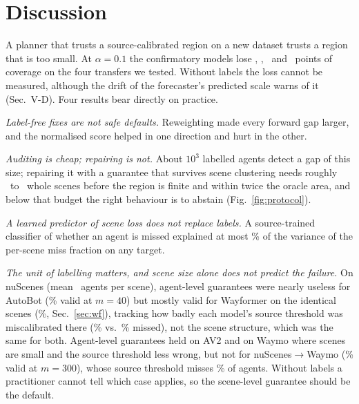 \section{Discussion}
A planner that trusts a source-calibrated region on a new dataset trusts a region that is too small. At $\alpha=0.1$
the confirmatory models lose \gapRawConf, \gapRawConfRev, \wmGapAvW\ and \wmGapNsW\ points of coverage on the four
transfers we tested. Without labels the loss cannot be measured, although the drift of the forecaster's predicted scale
warns of it (Sec.~V-D). Four results bear directly on practice.

\emph{Label-free fixes are not safe defaults.} Reweighting made every forward gap larger, and the normalised score
helped in one direction and hurt in the other.

\emph{Auditing is cheap; repairing is not.} About $10^3$ labelled agents detect a gap of this size; repairing it with a
guarantee that survives scene clustering needs roughly \recMMin\ to \recMMax\ whole scenes before the region is finite and
within twice the oracle area, and below that budget the right behaviour is to abstain (Fig.~\ref{fig:protocol}).

\emph{A learned predictor of scene loss does not replace labels.} A source-trained classifier of whether an agent is
missed explained at most \predBestRsq\% of the variance of the per-scene miss fraction on any target.

\emph{The unit of labelling matters, and scene size alone does not predict the failure.} On nuScenes (mean
\nsAgentsMean\ agents per scene), agent-level guarantees were nearly useless for AutoBot (\agentCorNsForty\% valid at
$m=40$) but mostly valid for Wayformer on the identical scenes (\agentCorWfForty\%, Sec.~\ref{sec:wf}), tracking how
badly each model's source threshold was miscalibrated there (\rSrcAutobot\% vs.\ \rSrcWayformer\% missed), not the
scene structure, which was the same for both. Agent-level guarantees held on AV2 and on Waymo where scenes are small
and the source threshold less wrong, but not for nuScenes$\to$Waymo (\agentCorNsWmThreeHundred\% valid at $m=300$),
whose source threshold misses \rSrcNsWm\% of agents. Without labels a practitioner cannot tell which case applies, so the scene-level guarantee should be the default.

